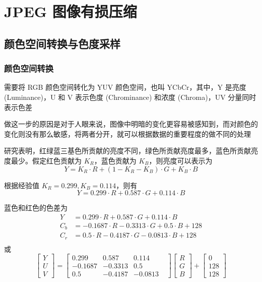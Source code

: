 \chapter{JPEG 图像有损压缩}
\section{颜色空间转换与色度采样}
\subsection{颜色空间转换}

需要将 RGB 颜色空间转化为 YUV 颜色空间，也叫 YCbCr，其中，Y 是亮度 (Luminance)，U 和 V 表示色度 (Chrominance) 和浓度 (Chroma)，UV 分量同时表示色差

做这一步的原因是对于人眼来说，图像中明暗的变化更容易被感知到，而对颜色的变化则没有那么敏感，将两者分开，就可以根据数据的重要程度的做不同的处理


研究表明，红绿蓝三基色所贡献的亮度不同，绿色所贡献亮度最多，蓝色所贡献亮度最少。假定红色贡献为 $K_R$，蓝色贡献为 $K_B$，则亮度可以表示为
\begin{equation}
    Y = K_R \cdot R + (1-K_R-K_B) \cdot G + K_B \cdot B
\end{equation}

根据经验值 $K_R=0.299, K_B=0.114$，则有
\begin{equation}
    Y = 0.299 \cdot R + 0.587 \cdot G + 0.114 \cdot B
\end{equation}

蓝色和红色的色差为
\begin{equation}
    \begin{aligned}
        Y   &= 0.299   \cdot R + 0.587    \cdot G + 0.114 \cdot B \\
        C_b &= -0.1687 \cdot R - 0.3313   \cdot G + 0.5 \cdot B +128\\
        C_r &= 0.5   \cdot R - 0.4187   \cdot G - 0.0813 \cdot B +128\\
    \end{aligned}    
\end{equation}
或
\begin{equation}
    \begin{bmatrix}
        Y \\ U \\ V
    \end{bmatrix}
    =\begin{bmatrix}
        0.299   & 0.587    & 0.114 & \\
        -0.1687 & -0.3313   & 0.5 & \\
        0.5     & -0.4187   & -0.0813 &
    \end{bmatrix}
    \begin{bmatrix}
        R \\ G \\ B
    \end{bmatrix}
    +\begin{bmatrix}
        0 \\ 128 \\ 128
    \end{bmatrix}
\end{equation}


